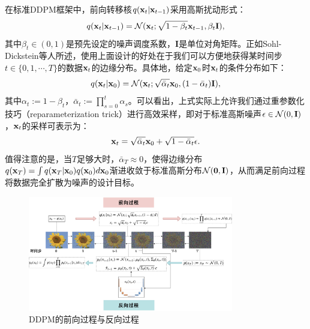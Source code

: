 \documentclass[11pt,a4paper,UTF8]{ctexart}
\begin{document}
在标准DDPM框架中，前向转移核$q(\mathbf{x}_t|\mathbf{x}_{t-1})$采用高斯扰动形式：
\begin{equation}
    q(\mathbf{x}_t|\mathbf{x}_{t-1}) =\mathcal{N}(\mathbf{x}_t;\sqrt{1-\beta_t}\mathbf{x}_{t-1},\beta_t\mathbf{I}),
\label{ddpm:forward_process}
\end{equation}
其中$\beta_t\in(0,1)$是预先设定的噪声调度系数，$\mathbf{I}$是单位对角矩阵。正如Sohl-Dickstein等人\cite{sohldickstein2015diffusion}所述，使用上面设计的好处在于我们可以方便地获得某时间步$t\in\{0,1,\cdots,T\}$的数据$\mathbf{x}_t$的边缘分布。具体地，给定$\mathbf{x}_0$时$\mathbf{x}_t$的条件分布如下：
\begin{equation}
    q(\mathbf{x}_t|\mathbf{x}_0)=\mathcal{N}(\mathbf{x}_t;\sqrt{\bar{\alpha}_t}\mathbf{x}_0,(1-\bar{\alpha}_t)\mathbf{I}),
\label{ddpm:bar_alpha}
\end{equation}
其中$\alpha_t:=1-\beta_t$，$\bar{\alpha}_t:=\prod_{s=0}^t\alpha_s$。可以看出，上式实际上允许我们通过重参数化技巧（reparameterization trick）进行高效采样，即对于标准高斯噪声$\epsilon\in\mathcal{N}(0,\mathbf{I})$，$\mathbf{x}_t$的采样可表示为：
\begin{equation*}
    \mathbf{x}_t=\sqrt{\bar{\alpha}_t}\mathbf{x}_0 + \sqrt{1-\bar{\alpha}_t}\epsilon.
\end{equation*}
值得注意的是，当$T$足够大时，$\bar{\alpha}_T\approx 0$，使得边缘分布$q(\mathbf{x}_T)=\int q(\mathbf{x}_T|\mathbf{x}_0)q(\mathbf{x}_0)d\mathbf{x}_0$渐进收敛于标准高斯分布$\mathcal{N}(\mathbf{0},\mathbf{I})$，从而满足前向过程将数据完全扩散为噪声的设计目标。

\begin{figure}[tbp]
\centering
\includegraphics[width=0.8\textwidth]{img/DDPM.jpg}
\caption{DDPM的前向过程与反向过程}
\label{fig:ddpm}
\end{figure}
\end{document}
